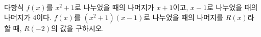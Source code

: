 다항식 $f(x)$를 $x^2+1$로 나누었을 때의 나머지가 $x+1$이고, $x-1$로 나누었을 때의 나머지가 $4$이다. $f(x)$를 $(x^2+1)(x-1)$로 나누었을 때의 나머지를 $R(x)$라 할 때, $R(-2)$의 값을 구하시오.
